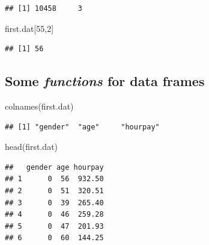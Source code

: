 \documentclass[
]{gitbook}
\newenvironment{Shaded}{\begin{snugshade}}{\end{snugshade}}
\newcommand{\DecValTok}[1]{\textcolor[rgb]{0.00,0.00,0.81}{#1}}
\newcommand{\FunctionTok}[1]{\textcolor[rgb]{0.00,0.00,0.00}{#1}}
\newcommand{\NormalTok}[1]{#1}
\begin{document}
\begin{verbatim}
## [1] 10458     3
\end{verbatim}

\begin{Shaded}
\begin{Highlighting}[]
\NormalTok{first.dat[}\DecValTok{55}\NormalTok{,}\DecValTok{2}\NormalTok{]}
\end{Highlighting}
\end{Shaded}

\begin{verbatim}
## [1] 56
\end{verbatim}


\hypertarget{some-functions-for-data-frames}{%
\subsection{\texorpdfstring{Some \emph{functions} for data frames}{Some functions for data frames}}\label{some-functions-for-data-frames}}

\footnotesize

\begin{Shaded}
\begin{Highlighting}[]
\FunctionTok{colnames}\NormalTok{(first.dat)}
\end{Highlighting}
\end{Shaded}

\begin{verbatim}
## [1] "gender"  "age"     "hourpay"
\end{verbatim}

\begin{Shaded}
\begin{Highlighting}[]
\FunctionTok{head}\NormalTok{(first.dat)}
\end{Highlighting}
\end{Shaded}

\begin{verbatim}
##   gender age hourpay
## 1      0  56  932.50
## 2      0  51  320.51
## 3      0  39  265.40
## 4      0  46  259.28
## 5      0  47  201.93
## 6      0  60  144.25
\end{verbatim}
\end{document}
